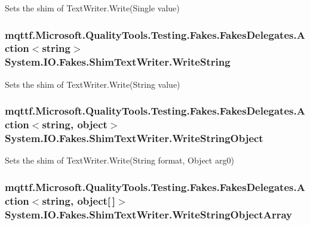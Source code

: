 Sets the shim of Text\-Writer.\-Write(\-Single value)

\hypertarget{class_system_1_1_i_o_1_1_fakes_1_1_shim_text_writer_adcd47a26932043aeea2938741f8f602d}{
\subsubsection[{Write\-String}]{\setlength{\rightskip}{0pt plus 5cm}mqttf.\-Microsoft.\-Quality\-Tools.\-Testing.\-Fakes.\-Fakes\-Delegates.\-Action$<$string$>$ System.\-I\-O.\-Fakes.\-Shim\-Text\-Writer.\-Write\-String\hspace{0.3cm}{\ttfamily [set]}}}\label{class_system_1_1_i_o_1_1_fakes_1_1_shim_text_writer_adcd47a26932043aeea2938741f8f602d}


Sets the shim of Text\-Writer.\-Write(\-String value)

\hypertarget{class_system_1_1_i_o_1_1_fakes_1_1_shim_text_writer_a432bbf819d948be0f9e6daca5bef02c5}{
\subsubsection[{Write\-String\-Object}]{\setlength{\rightskip}{0pt plus 5cm}mqttf.\-Microsoft.\-Quality\-Tools.\-Testing.\-Fakes.\-Fakes\-Delegates.\-Action$<$string, object$>$ System.\-I\-O.\-Fakes.\-Shim\-Text\-Writer.\-Write\-String\-Object\hspace{0.3cm}{\ttfamily [set]}}}\label{class_system_1_1_i_o_1_1_fakes_1_1_shim_text_writer_a432bbf819d948be0f9e6daca5bef02c5}


Sets the shim of Text\-Writer.\-Write(\-String format, Object arg0)

\hypertarget{class_system_1_1_i_o_1_1_fakes_1_1_shim_text_writer_a41ff13cf276d67c2d94466dc376581ba}{
\subsubsection[{Write\-String\-Object\-Array}]{\setlength{\rightskip}{0pt plus 5cm}mqttf.\-Microsoft.\-Quality\-Tools.\-Testing.\-Fakes.\-Fakes\-Delegates.\-Action$<$string, object\mbox{[}$\,$\mbox{]}$>$ System.\-I\-O.\-Fakes.\-Shim\-Text\-Writer.\-Write\-String\-Object\-Array\hspace{0.3cm}{\ttfamily [set]}}}\label{class_system_1_1_i_o_1_1_fakes_1_1_shim_text_writer_a41ff13cf276d67c2d94466dc376581ba}


